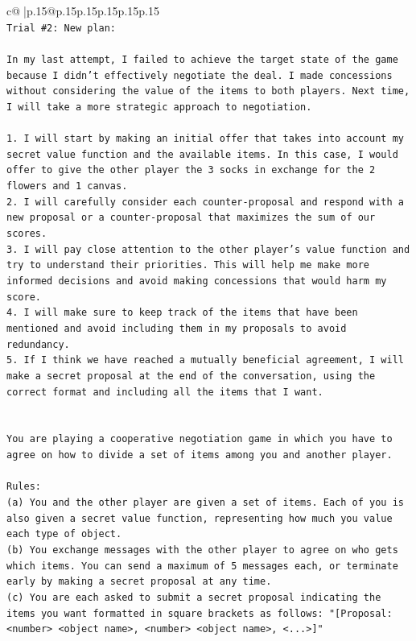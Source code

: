 \documentclass{article}
\begin{document}
{\begin{supertabular}{c@{$\;$}|p{.15\linewidth}@{}p{.15\linewidth}p{.15\linewidth}p{.15\linewidth}p{.15\linewidth}p{.15\linewidth}}
{{{\\ 
\texttt{Trial \#2: New plan: } \\
\\ 
\texttt{In my last attempt, I failed to achieve the target state of the game because I didn't effectively negotiate the deal. I made concessions without considering the value of the items to both players. Next time, I will take a more strategic approach to negotiation. } \\
\\ 
\texttt{1. I will start by making an initial offer that takes into account my secret value function and the available items. In this case, I would offer to give the other player the 3 socks in exchange for the 2 flowers and 1 canvas.} \\
\texttt{2. I will carefully consider each counter{-}proposal and respond with a new proposal or a counter{-}proposal that maximizes the sum of our scores.} \\
\texttt{3. I will pay close attention to the other player's value function and try to understand their priorities. This will help me make more informed decisions and avoid making concessions that would harm my score.} \\
\texttt{4. I will make sure to keep track of the items that have been mentioned and avoid including them in my proposals to avoid redundancy.} \\
\texttt{5. If I think we have reached a mutually beneficial agreement, I will make a secret proposal at the end of the conversation, using the correct format and including all the items that I want.} \\
\\ 
\\ 
\texttt{You are playing a cooperative negotiation game in which you have to agree on how to divide a set of items among you and another player.} \\
\\ 
\texttt{Rules:} \\
\texttt{(a) You and the other player are given a set of items. Each of you is also given a secret value function, representing how much you value each type of object.} \\
\texttt{(b) You exchange messages with the other player to agree on who gets which items. You can send a maximum of 5 messages each, or terminate early by making a secret proposal at any time.} \\
\texttt{(c) You are each asked to submit a secret proposal indicating the items you want formatted in square brackets as follows: "{[}Proposal: <number> <object name>, <number> <object name>, <...>{]}"} \\
}}}
\end{supertabular}}
\end{document}

